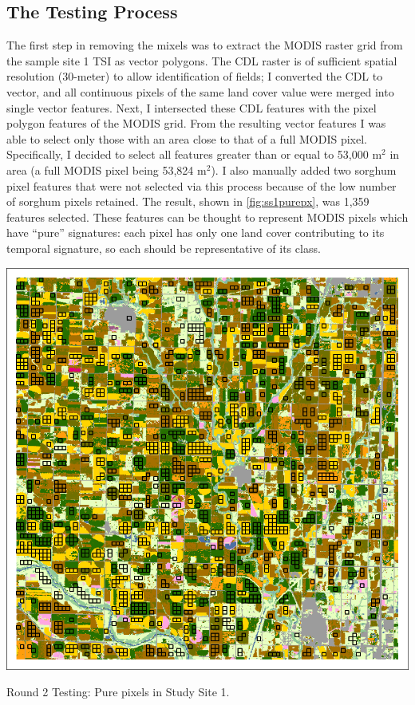 \subsection*{The Testing Process}

The first step in removing the mixels was to extract the MODIS raster grid from the sample site 1 TSI as vector polygons. The CDL raster is of sufficient spatial resolution (30-meter) to allow identification of fields; I converted the CDL to vector, and all continuous pixels of the same land cover value were merged into single vector features. Next, I intersected these CDL features with the pixel polygon features of the MODIS grid. From the resulting vector features I was able to select only those with an area close to that of a full MODIS pixel. Specifically, I decided to select all features greater than or equal to 53,000 m$^2$ in area (a full MODIS pixel being 53,824 m$^2$). I also manually added two sorghum pixel features that were not selected via this process because of the low number of sorghum pixels retained. The result, shown in \autoref{fig:ss1purepx}, was 1,359 features selected. These features can be thought to represent MODIS pixels which have “pure” signatures: each pixel has only one land cover contributing to its temporal signature, so each should be representative of its class.

\begin{ssfigure}
  \centering
  \includegraphics[width=.9\textwidth]{Graphics/Testing/clip1_30mCDL_pure_pixels.pdf}
  \caption{Round 2 Testing: Pure pixels in Study Site 1.}
  \label{fig:ss1purepx}
\end{ssfigure}

